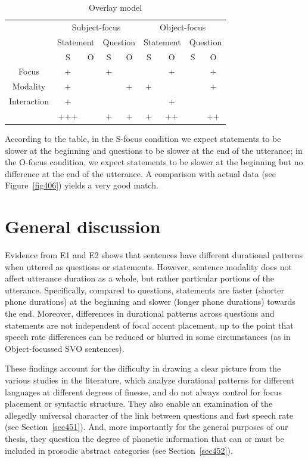 \begin{table}[h]
\centering
\begin{tabular}{c || c c | c c || c c | c c}
\mytoprule
& \multicolumn{4}{c}{Subject-focus} & \multicolumn{4}{c}{Object-focus}\\
& \multicolumn{2}{c}{Statement} & \multicolumn{2}{c}{Question} & \multicolumn{2}{c}{Statement} & \multicolumn{2}{c}{Question}\\
& S & O & S & O & S & O & S & O\\
\midrule
Focus & + &   & + &   &   & + &   & + \\
Modality & + &   &   & + & + &   &   & + \\
Interaction & + &   &   &   &   & + &   &  \\
\midrule
& +++ & & + & + & + & ++ & & ++ \\
\end{tabular}
\caption{Overlay model}
\label{tab43}\end{table}

According to the table, in the S-focus condition we expect statements to be slower at the beginning and questions to be slower at the end of the utterance; in the O-focus condition, we expect statements to be slower at the beginning but no difference at the end of the utterance. A comparison with actual data (see Figure~\ref{fig406}) yields a very good match.

\section{General discussion}\label{sec45}
Evidence from E1 and E2 shows that sentences have different durational patterns when uttered as questions or statements. However, sentence modality does not affect utterance duration as a whole, but rather particular portions of the utterance. Specifically, compared to questions, statements are faster (shorter phone durations) at the beginning and slower (longer phone durations) towards the end. Moreover, differences in durational patterns across questions and statements are not independent of focal accent placement, up to the point that speech rate differences can be reduced or blurred in some circumstances (as in Object-focussed SVO sentences). 

These findings account for the difficulty in drawing a clear picture from the various studies in the literature, which analyze durational patterns for different languages at different degrees of finesse, and do not always control for focus placement or syntactic structure. They also enable an examination of the allegedly universal character of the link between questions and fast speech rate (see Section~\ref{sec451}). And, more importantly for the general purposes of our thesis, they question the degree of phonetic information that can or must be included in prosodic abstract categories (see Section~\ref{sec452}).

